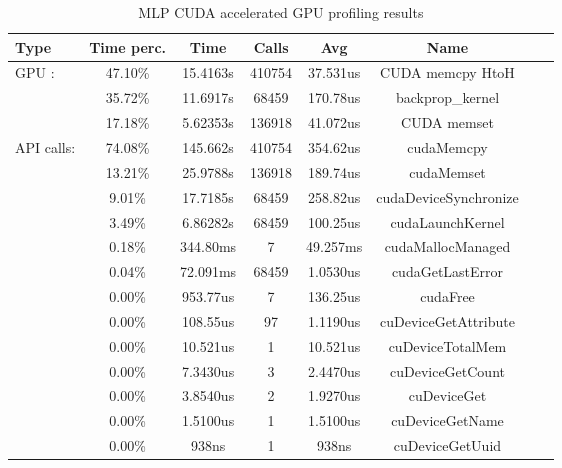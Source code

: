 \documentclass[11pt]{article}
\begin{document}
\begin{table}[h]\centering
	\begin{tabular}{|l|c|c|c|c|c|c|c|}
		\hline
		\textbf{Type} & \textbf{Time perc.} & \textbf{Time} & \textbf{Calls} & \textbf{Avg} & \textbf{Name}         \\ \hline
		GPU :         & 47.10\%             & 15.4163s      & 410754         & 37.531us     & CUDA memcpy HtoH      \\ \hline
		              & 35.72\%             & 11.6917s      & 68459          & 170.78us     & backprop\_kernel      \\ \hline
		              & 17.18\%             & 5.62353s      & 136918         & 41.072us     & CUDA memset           \\ \hline
		API calls:    & 74.08\%             & 145.662s      & 410754         & 354.62us     & cudaMemcpy            \\ \hline
		              & 13.21\%             & 25.9788s      & 136918         & 189.74us     & cudaMemset            \\ \hline
		              & 9.01\%              & 17.7185s      & 68459          & 258.82us     & cudaDeviceSynchronize \\ \hline
		              & 3.49\%              & 6.86282s      & 68459          & 100.25us     & cudaLaunchKernel      \\ \hline
		              & 0.18\%              & 344.80ms      & 7              & 49.257ms     & cudaMallocManaged     \\ \hline
		              & 0.04\%              & 72.091ms      & 68459          & 1.0530us     & cudaGetLastError      \\ \hline
		              & 0.00\%              & 953.77us      & 7              & 136.25us     & cudaFree              \\ \hline
		              & 0.00\%              & 108.55us      & 97             & 1.1190us     & cuDeviceGetAttribute  \\ \hline
		              & 0.00\%              & 10.521us      & 1              & 10.521us     & cuDeviceTotalMem      \\ \hline
		              & 0.00\%              & 7.3430us      & 3              & 2.4470us     & cuDeviceGetCount      \\ \hline
		              & 0.00\%              & 3.8540us      & 2              & 1.9270us     & cuDeviceGet           \\ \hline
		              & 0.00\%              & 1.5100us      & 1              & 1.5100us     & cuDeviceGetName       \\ \hline
		              & 0.00\%              & 938ns         & 1              & 938ns        & cuDeviceGetUuid       \\ \hline
	\end{tabular}
	\caption{MLP CUDA accelerated GPU profiling results}
	\label{tab:mlp_cuda_profiler}
\end{table}
\end{document}
